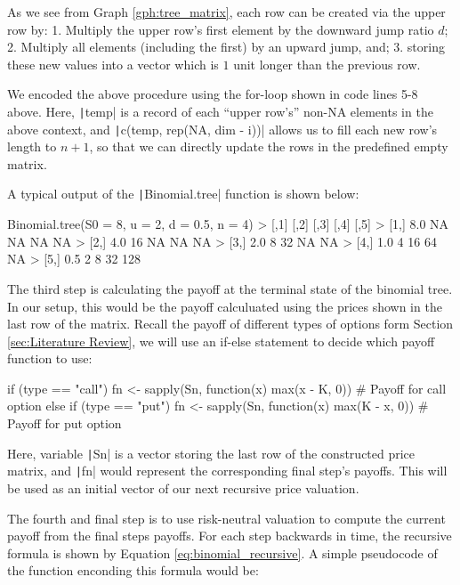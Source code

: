 As we see from Graph \ref{gph:tree_matrix}, each row can be created via the upper row by: 1. Multiply the upper row's first element by the downward jump ratio $d$; 2. Multiply all elements (including the first) by an upward jump, and; 3. storing these new values into a vector which is $1$ unit longer than the previous row.

We encoded the above procedure using the for-loop shown in code lines 5-8 above. Here, \texttt|temp| is a record of each ``upper row's'' non-NA elements in the above context, and \texttt|c(temp, rep(NA, dim - i))| allows us to fill each new row's length to $n+1$, so that we can directly update the rows in the predefined empty matrix.

A typical output of the \texttt|Binomial.tree| function is shown below:

\begin{Rminted}
Binomial.tree(S0 = 8, u = 2, d = 0.5, n = 4)
>      [,1] [,2] [,3] [,4] [,5]
> [1,]  8.0   NA   NA   NA   NA
> [2,]  4.0   16   NA   NA   NA
> [3,]  2.0    8   32   NA   NA
> [4,]  1.0    4   16   64   NA
> [5,]  0.5    2    8   32  128
\end{Rminted}

The third step is calculating the payoff at the terminal state of the binomial tree. In our setup, this would be the payoff calculuated using the prices shown in the last row of the matrix. Recall the payoff of different types of options form Section \ref{sec:Literature Review}, we will use an if-else statement to decide which payoff function to use:

\begin{Rminted}
if (type == "call") {
    fn <- sapply(Sn, function(x) {max(x - K, 0)}) # Payoff for call option
} else if (type == "put") {
    fn <- sapply(Sn, function(x) {max(K - x, 0)}) # Payoff for put option
}
\end{Rminted}

Here, variable \texttt|Sn| is a vector storing the last row of the constructed price matrix, and \texttt|fn| would represent the corresponding final step's payoffs. This will be used as an initial vector of our next recursive price valuation.

The fourth and final step is to use risk-neutral valuation to compute the current payoff from the final steps payoffs. For each step backwards in time, the recursive formula is shown by Equation \ref{eq:binomial_recursive}. A simple pseudocode of the function enconding this formula would be:

